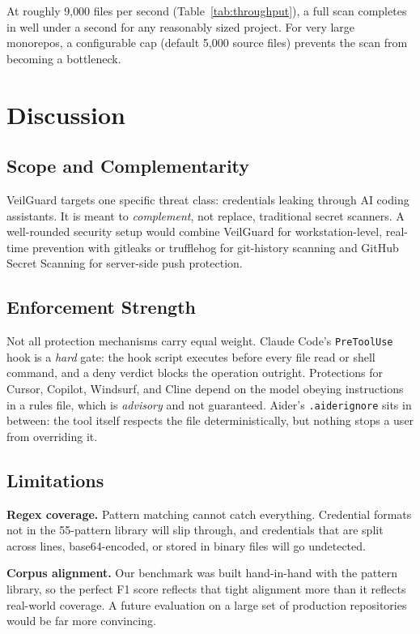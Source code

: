 \documentclass[conference]{IEEEtran}
\begin{document}
At roughly 9{,}000 files per second (Table~\ref{tab:throughput}), a full scan
completes in well under a second for any reasonably sized project. For very
large monorepos, a configurable cap (default 5{,}000 source files) prevents
the scan from becoming a bottleneck.


\section{Discussion}
\label{sec:discussion}

\subsection{Scope and Complementarity}

VeilGuard targets one specific threat class: credentials leaking through AI
coding assistants. It is meant to \emph{complement}, not replace, traditional
secret scanners. A well-rounded security setup would combine VeilGuard for
workstation-level, real-time prevention with gitleaks or trufflehog for
git-history scanning and GitHub Secret Scanning for server-side push protection.

\subsection{Enforcement Strength}

Not all protection mechanisms carry equal weight. Claude Code's
\texttt{PreToolUse} hook is a \emph{hard} gate: the hook script executes before
every file read or shell command, and a deny verdict blocks the operation
outright. Protections for Cursor, Copilot, Windsurf, and Cline depend on the
model obeying instructions in a rules file, which is \emph{advisory} and not
guaranteed. Aider's \texttt{.aiderignore} sits in between: the tool itself
respects the file deterministically, but nothing stops a user from overriding
it.

\subsection{Limitations}

\textbf{Regex coverage.} Pattern matching cannot catch everything. Credential
formats not in the 55-pattern library will slip through, and credentials that
are split across lines, base64-encoded, or stored in binary files will go
undetected.

\textbf{Corpus alignment.} Our benchmark was built hand-in-hand with the
pattern library, so the perfect F1 score reflects that tight alignment more
than it reflects real-world coverage. A future evaluation on a large set of
production repositories would be far more convincing.
\end{document}
